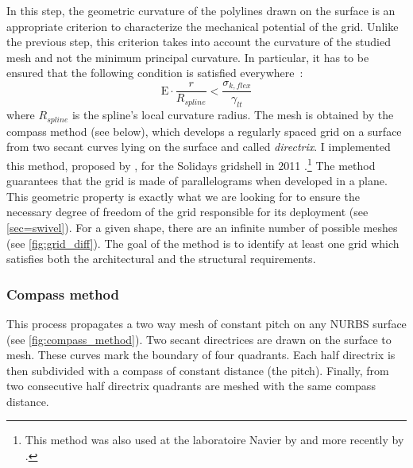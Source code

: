 In this step, the geometric curvature of the polylines drawn on the surface is an appropriate criterion to characterize the mechanical potential of the grid. Unlike the previous step, this criterion takes into account the curvature of the studied mesh and not the minimum principal curvature. In particular, it has to be ensured that the following condition is satisfied everywhere~:
\begin{equation}
	\mathrm{E} \cdot   \frac{r}{R_{spline}}  <   \frac{\sigma_{k,flex}}{\gamma_{lt}}
	\label{eq:crit_2}
\end{equation}
where $R_{spline}$ is the spline’s local curvature radius. The mesh is obtained by the compass method (see below), which develops a regularly spaced grid on a surface from two secant curves lying on the surface and called \emph{directrix}. I implemented this method, proposed by \citet{IL10}, for the Solidays gridshell in 2011 \cite{DuPeloux2011}.\footnote{This method was also used at the laboratoire Navier by  and more recently by .} The method guarantees that the grid is made of parallelograms when developed in a plane. This geometric property is exactly what we are looking for to ensure the necessary degree of freedom of the grid responsible for its deployment (see \cref{sec=swivel}). For a given shape, there are an infinite number of possible meshes (see \cref{fig:grid_diff}). The goal of the method is to identify at least one grid which satisfies both the architectural and the structural requirements.


\subsubsection{Compass method}\label{sec=compass}
This process propagates a two way mesh of constant pitch on any NURBS surface (see \cref{fig:compass_method}). Two secant directrices are drawn on the surface to mesh. These curves mark the boundary of four quadrants. Each half directrix is then subdivided with a compass of constant distance (the pitch). Finally, from two consecutive half directrix quadrants are meshed with the same compass distance.

